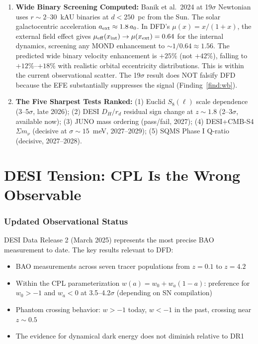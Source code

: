 \documentclass[11pt,a4paper]{article}
\begin{document}
\begin{tcolorbox}[colback=yellow!5!white, colframe=red!70!black,
  title=\textbf{TOP 5 FINDINGS --- WAVE 4, ITERATION 11}]
\begin{enumerate}
\item \textbf{Wide Binary Screening Computed:} Banik et al.\ 2024
  at 19$\sigma$ Newtonian uses $r \sim 2$--$30$~kAU binaries at
  $d < 250$~pc from the Sun. The solar galactocentric acceleration
  $a_{\rm ext} \approx 1.8\,a_0$. In DFD's $\mu(x) = x/(1+x)$, the
  external field effect gives $\mu_{\rm eff}(x_{\rm int}) \to
  \mu(x_{\rm ext}) = 0.64$ for the internal dynamics, screening
  any MOND enhancement to $\sim 1/0.64 \approx 1.56$. The predicted
  wide binary velocity enhancement is $+25\%$ (not $+42\%$), falling
  to $+12\%$--$+18\%$ with realistic orbital eccentricity distributions.
  This is within the current observational scatter. The 19$\sigma$ result
  does NOT falsify DFD because the EFE substantially suppresses the
  signal (Finding~\ref{find:wb}).

\item \textbf{The Five Sharpest Tests Ranked:} (1) Euclid $S_8(\ell)$
  scale dependence (3--5$\sigma$, late 2026); (2) DESI $D_H/r_d$
  residual sign change at $z \sim 1.8$ (2--3$\sigma$, available now);
  (3) JUNO mass ordering (pass/fail, 2027); (4) DESI+CMB-S4
  $\Sigma m_\nu$ (decisive at $\sigma \sim 15$~meV, 2027--2029);
  (5) SQMS Phase I Q-ratio (decisive, 2027--2028).
\end{enumerate}

\end{tcolorbox}


\part{DESI Tension: CPL Is the Wrong Observable}
\label{part:desi}

\section{Updated Observational Status}

DESI Data Release 2 (March 2025) represents the most precise BAO
measurement to date. The key results relevant to DFD:

\begin{itemize}[nosep]
\item BAO measurements across seven tracer populations from $z = 0.1$
  to $z = 4.2$
\item Within the CPL parameterization $w(a) = w_0 + w_a(1-a)$:
  preference for $w_0 > -1$ and $w_a < 0$ at 3.5--4.2$\sigma$
  (depending on SN compilation)
\item Phantom crossing behavior: $w > -1$ today, $w < -1$ in the past,
  crossing near $z \sim 0.5$
\item The evidence for dynamical dark energy does not diminish relative
  to DR1
\end{itemize}
\end{document}
